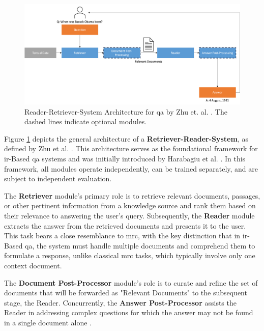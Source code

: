 \begin{figure}
    \centering
    \includegraphics[width=\textwidth]{Grafiken/Retriever_Reader.png}
    \caption{Reader-Retriever-System Architecture for \gls{qa} by Zhu et. al. \cite{zhu_retrieving_2021}. The dashed lines indicate optional modules.}
    \label{fig:rr_architecture}
\end{figure}

Figure \ref{fig:rr_architecture} depicts the general architecture of a \textbf{Retriever-Reader-System}, as defined by Zhu et al. \cite{zhu_retrieving_2021}. This architecture serves as the foundational framework for \gls{ir}-Based \gls{qa} systems and was initially introduced by Harabagiu et al. \cite{harabagiu_open_domain_2003}. In this framework, all modules operate independently, can be trained separately, and are subject to independent evaluation.

The \textbf{Retriever} module's primary role is to retrieve relevant documents, passages, or other pertinent information from a knowledge source and rank them based on their relevance to answering the user's query. Subsequently, the \textbf{Reader} module extracts the answer from the retrieved documents and presents it to the user. This task bears a close resemblance to \gls{mrc}, with the key distinction that in \gls{ir}-Based \gls{qa}, the system must handle multiple documents and comprehend them to formulate a response, unlike classical \gls{mrc} tasks, which typically involve only one context document.

The \textbf{Document Post-Processor} module's role is to curate and refine the set of documents that will be forwarded as "Relevant Documents" to the subsequent stage, the Reader. Concurrently, the \textbf{Answer Post-Processor} assists the Reader in addressing complex questions for which the answer may not be found in a single document alone \cite{zhu_retrieving_2021,jurafsky_speech_2023}.

